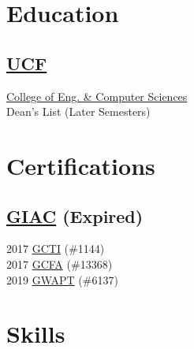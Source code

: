 \documentclass[letterpaper]{deedy-resume} %
\begin{document}
\begin{minipage}[t]{0.33\textwidth} %


\section{Education}
\subsection{\href{https://www.ucf.edu/}{UCF}}
\href{https://www.cecs.ucf.edu/}{College of Eng. \& Computer Sciences} \\
Dean's List (Later Semesters) \\

\sectionspace %



\section{Certifications}
\subsection{\href{https://www.giac.org/}{GIAC} (Expired)}
2017 \href{https://www.giac.org/certifications/cyber-threat-intelligence-gcti/}{GCTI} (\#1144) \\
2017 \href{https://www.giac.org/certifications/certified-forensic-analyst-gcfa/}{GCFA} (\#13368) \\
2019 \href{https://www.giac.org/certifications/web-application-penetration-tester-gwapt/}{GWAPT} (\#6137) \\
\sectionspace %


\section{Skills}


\end{minipage}
\end{document}

